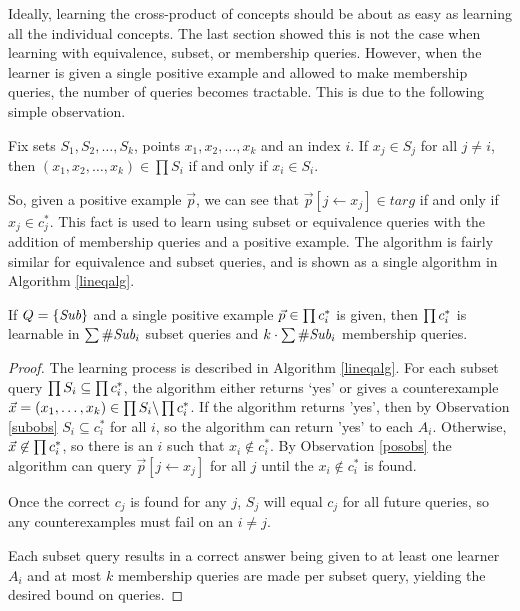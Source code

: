 Ideally, learning the cross-product of concepts should be about as easy as learning all the individual concepts.
The last section showed this is not the case when learning with equivalence, subset, or membership queries.
However, when the learner is given a single positive example and allowed to make membership queries, the number of queries becomes tractable. 
This is due to the following simple observation.

\begin{observation}
\label{posobs}
Fix sets $S_1, S_2, \dots, S_k$, points $x_1, x_2, \dots, x_k$ and an index $i$. 
If $x_j \in S_j$ for all $j \ne i$, then $(x_1, x_2, \dots, x_k) \in \prod S_i$ if and only if $x_i \in S_i$.
\end{observation}

So, given a positive example $\vec{p}$,  we can see that $\vec{p}[j \leftarrow x_j] \in targ$ if and only if $x_j \in c^*_j$.
This fact is used to learn using subset or equivalence queries with the addition of membership queries and a positive example.
The algorithm is fairly similar for equivalence and subset queries, and is shown as a single algorithm in Algorithm \ref{lineqalg}.
 

\begin{proposition}
If $Q = \{\emph{Sub}\}$ and a single positive example $\vec{p} \in \prod c^*_i$ is given, then $\prod c^*_i$ is learnable in $\sum \#\emph{Sub}_{i}$ subset queries and $k \cdot \sum \#\emph{Sub}_{i}$ membership queries. 
\end{proposition}
\begin{proof}
The learning process is described in Algorithm \ref{lineqalg}.
For each subset query $\prod S_i \subseteq \prod c^*_i$, the algorithm either returns `yes' or gives a counterexample $\vec{x} = (x_1, \dots, x_k) \in \prod S_i \backslash \prod c^*_i$. 
If the algorithm returns 'yes', then by Observation \ref{subobs} $S_i \subseteq c^*_i$ for all $i$, so the algorithm can return 'yes' to each $A_i$. 
Otherwise, $\vec{x} \not\in \prod c^*_i$, so there is an $i$ such that $x_i \not\in c^*_i$. 
By Observation \ref{posobs} the algorithm can query $\vec{p}[j \leftarrow x_j]$ for all $j$ until the $x_i \not\in c^*_i$ is found. 

Once the correct $c_j$ is found for any $j$, $S_j$ will equal $c_j$ for all future queries, so any counterexamples must fail on an $i \ne j$. 

Each subset query results in a correct answer being given to at least one learner $A_i$ and at most $k$ membership queries are made per subset query, yielding the desired bound on queries. 
\end{proof}


